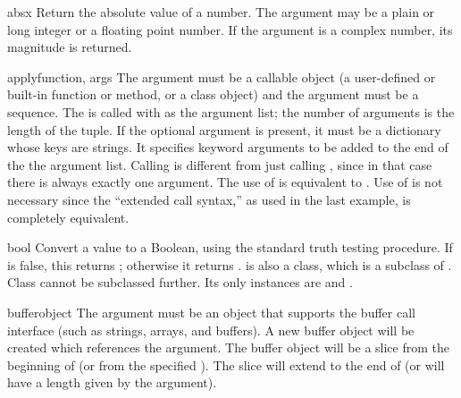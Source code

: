 \begin{funcdesc}{abs}{x}
  Return the absolute value of a number.  The argument may be a plain
  or long integer or a floating point number.  If the argument is a
  complex number, its magnitude is returned.
\end{funcdesc}

\begin{funcdesc}{apply}{function, args}
  The  argument must be a callable object (a
  user-defined or built-in function or method, or a class object) and
  the  argument must be a sequence.  The  is
  called with  as the argument list; the number of arguments
  is the length of the tuple.
  If the optional  argument is present, it must be a
  dictionary whose keys are strings.  It specifies keyword arguments
  to be added to the end of the the argument list.
  Calling  is different from just calling
  , since in that case there is always
  exactly one argument.  The use of  is equivalent
  to .
  Use of  is not necessary since the ``extended call
  syntax,'' as used in the last example, is completely equivalent.

\end{funcdesc}

\begin{funcdesc}{bool}{}
  Convert a value to a Boolean, using the standard truth testing
  procedure.  If  is false, this returns ;
  otherwise it returns .   is also a class,
  which is a subclass of .  Class  cannot be
  subclassed further.  Its only instances are  and
  .


\end{funcdesc}

\begin{funcdesc}{buffer}{object}
  The  argument must be an object that supports the buffer
  call interface (such as strings, arrays, and buffers).  A new buffer
  object will be created which references the  argument.
  The buffer object will be a slice from the beginning of 
  (or from the specified ). The slice will extend to the
  end of  (or will have a length given by the 
  argument).
\end{funcdesc}

